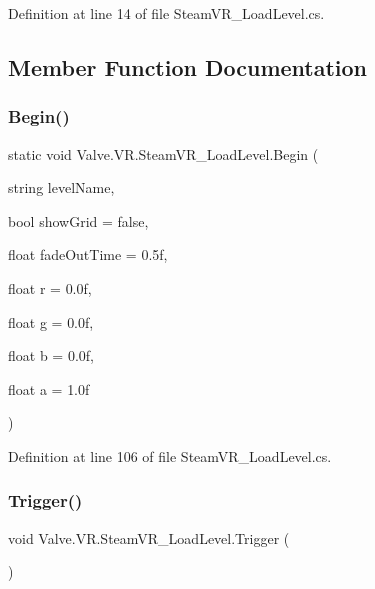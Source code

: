 Definition at line 14 of file Steam\+V\+R\+\_\+\+Load\+Level.\+cs.



\subsection{Member Function Documentation}
\mbox{\label{class_valve_1_1_v_r_1_1_steam_v_r___load_level_aed516148c0b0add76c609f6184550ac4}} 
\subsubsection{\texorpdfstring{Begin()}{Begin()}}
{\footnotesize\ttfamily static void Valve.\+V\+R.\+Steam\+V\+R\+\_\+\+Load\+Level.\+Begin (\begin{DoxyParamCaption}\item[{string}]{level\+Name,  }\item[{bool}]{show\+Grid = {\ttfamily false},  }\item[{float}]{fade\+Out\+Time = {\ttfamily 0.5f},  }\item[{float}]{r = {\ttfamily 0.0f},  }\item[{float}]{g = {\ttfamily 0.0f},  }\item[{float}]{b = {\ttfamily 0.0f},  }\item[{float}]{a = {\ttfamily 1.0f} }\end{DoxyParamCaption})\hspace{0.3cm}{\ttfamily [static]}}



Definition at line 106 of file Steam\+V\+R\+\_\+\+Load\+Level.\+cs.

\mbox{\label{class_valve_1_1_v_r_1_1_steam_v_r___load_level_a159effd47c6ba4c6e2d58951c17135d0}} 
\subsubsection{\texorpdfstring{Trigger()}{Trigger()}}
{\footnotesize\ttfamily void Valve.\+V\+R.\+Steam\+V\+R\+\_\+\+Load\+Level.\+Trigger (\begin{DoxyParamCaption}{ }\end{DoxyParamCaption})}



